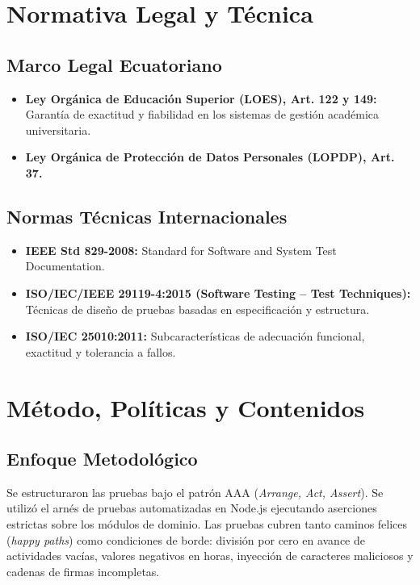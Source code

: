 \documentclass[12pt,a4paper]{article}
\begin{document}
\section{Normativa Legal y Técnica}
\subsection{Marco Legal Ecuatoriano}
\begin{itemize}[leftmargin=1.5em, itemsep=2pt]
    \item \textbf{Ley Orgánica de Educación Superior (LOES), Art. 122 y 149:} Garantía de exactitud y fiabilidad en los sistemas de gestión académica universitaria.
    \item \textbf{Ley Orgánica de Protección de Datos Personales (LOPDP), Art. 37.}
\end{itemize}
\subsection{Normas Técnicas Internacionales}
\begin{itemize}[leftmargin=1.5em, itemsep=2pt]
    \item \textbf{IEEE Std 829-2008:} Standard for Software and System Test Documentation.
    \item \textbf{ISO/IEC/IEEE 29119-4:2015 (Software Testing -- Test Techniques):} Técnicas de diseño de pruebas basadas en especificación y estructura.
    \item \textbf{ISO/IEC 25010:2011:} Subcaracterísticas de adecuación funcional, exactitud y tolerancia a fallos.
\end{itemize}

\section{Método, Políticas y Contenidos}
\subsection{Enfoque Metodológico}
Se estructuraron las pruebas bajo el patrón AAA (\textit{Arrange, Act, Assert}). Se utilizó el arnés de pruebas automatizadas en Node.js ejecutando aserciones estrictas sobre los módulos de dominio. Las pruebas cubren tanto caminos felices (\textit{happy paths}) como condiciones de borde: división por cero en avance de actividades vacías, valores negativos en horas, inyección de caracteres maliciosos y cadenas de firmas incompletas.
\end{document}
